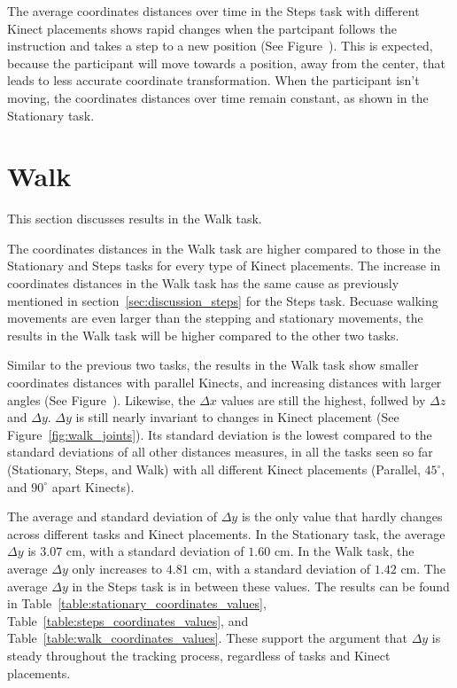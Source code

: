 The average coordinates distances over time in the Steps task with different Kinect placements shows rapid changes when the partcipant follows the instruction and takes a step to a new position (See Figure~). This is expected, because the participant will move towards a position, away from the center, that leads to less accurate coordinate transformation. When the participant isn't moving, the coordinates distances over time remain constant, as shown in the Stationary task.

\section{Walk}
\label{sec:discussion_walk}

This section discusses results in the Walk task.

The coordinates distances in the Walk task are higher compared to those in the Stationary and Steps tasks for every type of Kinect placements. The increase in coordinates distances in the Walk task has the same cause as previously mentioned in section~\ref{sec:discussion_steps} for the Steps task. Becuase walking movements are even larger than the stepping and stationary movements, the results in the Walk task will be higher compared to the other two tasks.

Similar to the previous two tasks, the results in the Walk task show smaller coordinates distances with parallel Kinects, and increasing distances with larger angles (See Figure~). Likewise, the $\Delta x$ values are still the highest, follwed by $\Delta z$ and $\Delta y$. $\Delta y$ is still nearly invariant to changes in Kinect placement (See Figure~\ref{fig:walk_joints}). Its standard deviation is the lowest compared to the standard deviations of all other distances measures, in all the tasks seen so far (Stationary, Steps, and Walk) with all different Kinect placements (Parallel, $45^{\circ}$, and $90^{\circ}$ apart Kinects).

The average and standard deviation of $\Delta y$ is the only value that hardly changes across different tasks and Kinect placements. In the Stationary task, the average $\Delta y$ is $3.07$ cm, with a standard deviation of $1.60$ cm. In the Walk task, the average $\Delta y$ only increases to $4.81$ cm, with a standard deviation of $1.42$ cm. The average $\Delta y$ in the Steps task is in between these values. The results can be found in Table~\ref{table:stationary_coordinates_values}, Table~\ref{table:steps_coordinates_values}, and Table~\ref{table:walk_coordinates_values}. These support the argument that $\Delta y$ is steady throughout the tracking process, regardless of tasks and Kinect placements.

